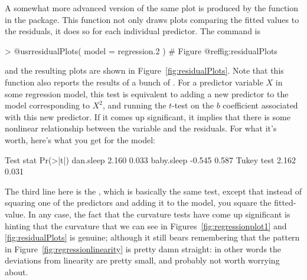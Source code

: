 A somewhat more advanced version of the same plot is produced by the  function in the  package. This function not only draws plots comparing the fitted values to the residuals, it does so for each individual predictor. The command is
\begin{rblock1}
> @usr{residualPlots( model = regression.2 )}   # Figure @ref{fig:residualPlots}
\end{rblock1}	
and the resulting plots are shown in Figure~\ref{fig:residualPlots}. Note that this function also reports the results of a bunch of . For a predictor variable $X$ in some regression model, this test is equivalent to adding a new predictor to the model corresponding to $X^2$, and running the $t$-test on the $b$ coefficient associated with this new predictor. If it comes up significant, it implies that there is some nonlinear relationship between the variable and the residuals. For what it's worth, here's what you get for the  model:
\begin{rblock1}
           Test stat Pr(>|t|)
dan.sleep      2.160    0.033
baby.sleep    -0.545    0.587
Tukey test     2.162    0.031
\end{rblock1}
The third line here is the , which is basically the same test, except that instead of squaring one of the predictors and adding it to the model, you square the fitted-value. In any case, the fact that the curvature tests have come up significant is hinting that the curvature that we can see in Figures~\ref{fig:regressionplot1} and \ref{fig:residualPlots} is genuine; although it still bears remembering that the pattern in Figure~\ref{fig:regressionlinearity} is pretty damn straight: in other words the deviations from linearity are pretty small, and probably not worth worrying about.

